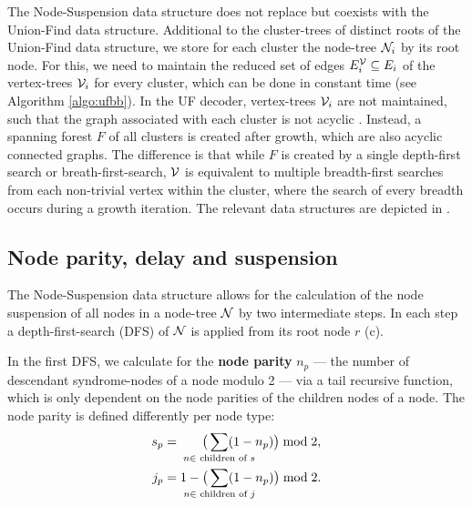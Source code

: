 The Node-Suspension data structure does not replace but coexists with the Union-Find data structure. Additional to the cluster-trees of distinct roots of the Union-Find data structure, we store for each cluster the node-tree $\mathcal{N}_i$ by its root node. For this, we need to maintain the reduced set of edges $E^{\mathcal{V}}_i \subseteq E_i$ of the vertex-trees $\mathcal{V}_i$ for every cluster, which can be done in constant time (see Algorithm \ref{algo:ufbb}). In the UF decoder, vertex-trees $\mathcal{V}_i$ are not maintained, such that the graph associated with each cluster is not acyclic \cite{delfosse2017almost}. Instead, a spanning forest $F$ of all clusters is created \cite{delfosse2017linear} after growth, which are also acyclic connected graphs. The difference is that while $F$ is created by a single depth-first search or breath-first-search, $\mathcal{V}$ is equivalent to multiple breadth-first searches from each non-trivial vertex within the cluster, where the search of every breadth occurs during a growth iteration. The relevant data structures are depicted in . 


\subsection{Node parity, delay and suspension}\label{sec:paritydelaysus}

The Node-Suspension data structure allows for the calculation of the node suspension of all nodes in a node-tree $\mathcal{N}$ by two intermediate steps. In each step a depth-first-search (DFS) of $\mathcal{N}$ is applied from its root node $r$ (c).

In the first DFS, we calculate for the \textbf{node parity} $n_p$ --- the number of descendant syndrome-nodes of a node modulo 2 --- via a tail recursive function, which is only dependent on the node parities of the children nodes of a node. The node parity is defined differently per node type:
\begin{align}\label{eq:nodeparity}
    s_p &= \hspace{.6cm}\big( \sum_{\mathclap{n \in \text{ children of } s}} (1-n_p) \big ) \bmod 2,\\
    j_p &= 1 - \big(\sum_{\mathclap{n \in \text{ children of } j}} (1-n_p) \big) \bmod 2.
\end{align}

